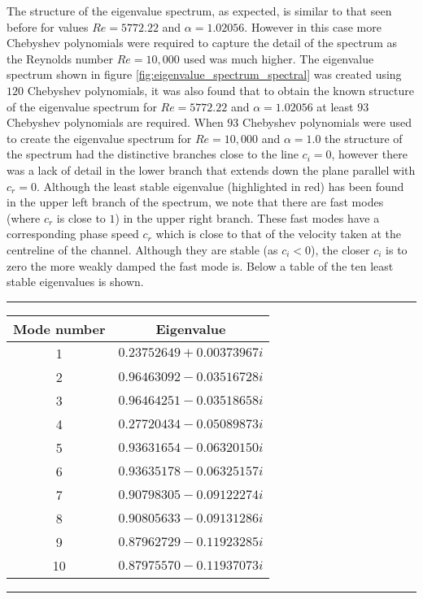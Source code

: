 \documentclass[a4paper, 12pt, twoside, openright]{article}
\numberwithin{equation}{section}
\begin{document}
The structure of the eigenvalue spectrum, as expected, is similar to that seen before for values $Re=5772.22$ and $\alpha=1.02056$. However in this case more Chebyshev polynomials were required to capture the detail of the spectrum as the Reynolds number $Re=10,000$ used was much higher. The eigenvalue spectrum shown in figure \ref{fig:eigenvalue_spectrum_spectral} was created using $120$ Chebyshev polynomials, it was also found that to obtain the known structure of the eigenvalue spectrum for $Re=5772.22$ and $\alpha=1.02056$ at least $93$ Chebyshev polynomials are required. When $93$ Chebyshev polynomials were used to create the eigenvalue spectrum for $Re=10,000$ and $\alpha=1.0$ the structure of the spectrum had the distinctive branches close to the line $c_i =0$, however there was a lack of detail in the lower branch that extends down the plane parallel with $c_r=0$. Although the least stable eigenvalue (highlighted in red) has been found in the upper left branch of the spectrum, we note that there are fast modes (where $c_r$ is close to $1$) in the upper right branch. These fast modes have a corresponding phase speed $c_r$ which is close to that of the velocity taken at the centreline of the channel. Although they are stable (as $c_i<0$), the closer $c_i$ is to zero the more weakly damped the fast mode is. Below a table of the ten least stable eigenvalues is shown.                   

\begin{table}[H]
\centering
\rule{\linewidth}{1.5pt}
\bgroup
\def\arraystretch{1.25}
\begin{tabular}{ c@{\qquad} c }
Mode number & Eigenvalue  \\\hline
1 & $0.23752649 + 0.00373967i$ \\ %
2 & $0.96463092 - 0.03516728i$ \\ %
3 & $0.96464251 - 0.03518658i$ \\ %
4 & $0.27720434 - 0.05089873i$ \\ %
5 & $0.93631654 - 0.06320150i$ \\ %
6 & $0.93635178 - 0.06325157i$ \\ %
7 & $0.90798305 - 0.09122274i$ \\ %
8 & $0.90805633 - 0.09131286i$ \\ %
9 & $0.87962729 - 0.11923285i$ \\ %
10 & $0.87975570 - 0.11937073i$ \\ %
\end{tabular}
\egroup
{}
\rule{\linewidth}{1.5pt}
\end{table}
\end{document}
